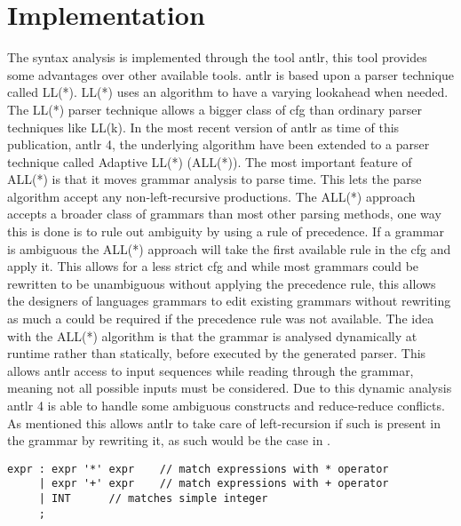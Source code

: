 \section{Implementation}
The syntax analysis is implemented through the tool \acrfull{antlr}, this tool provides some advantages over other available tools.
\acrshort{antlr} is based upon a parser technique called LL(*).
LL(*) uses an algorithm to have a varying lookahead when needed.
The LL(*) parser technique allows a bigger class of \acrshort{cfg} than ordinary parser techniques like LL(k).
In the most recent version of \acrshort{antlr} as time of this publication, \acrshort{antlr} 4, the underlying algorithm have been extended to a parser technique called Adaptive LL(*) (ALL(*)).
The most important feature of ALL(*) is that it moves grammar analysis to parse time.
This lets the parse algorithm accept any non-left-recursive productions.
The ALL(*) approach accepts a broader class of grammars than most other parsing methods, one way this is done is to rule out ambiguity by using a rule of precedence.
If a grammar is ambiguous the ALL(*) approach will take the first  available rule in the \acrshort{cfg} and apply it.
This allows for a less strict \acrshort{cfg} and while most grammars could be rewritten to be unambiguous without applying the precedence rule, this allows the designers of languages grammars to edit existing grammars without rewriting as much a could be required if the precedence rule was not available.	
The idea with the ALL(*) algorithm is that the grammar is analysed dynamically at runtime rather than statically, before executed by the generated parser.
This allows \acrshort{antlr} access to input sequences while reading through the grammar, meaning not all possible inputs must be considered.
Due to this dynamic analysis \acrshort{antlr} 4 is able to handle some ambiguous constructs and reduce-reduce conflicts.
As mentioned this allows \acrshort{antlr} to take care of left-recursion if such is present in the grammar by rewriting it, as such would be the case in .

\begin{lstlisting}[caption=An ambiguous rule for expr,frame=tlrb,label={lst:amb}]
expr : expr '*' expr 	// match expressions with * operator
     | expr '+' expr 	// match expressions with + operator
     | INT 		// matches simple integer
     ;
\end{lstlisting}

